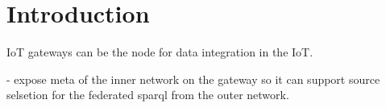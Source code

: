 \section{Introduction}

IoT gateways can be the node for data integration in the IoT.

- expose meta of the inner network on the gateway so it can support source selsetion for the federated sparql from the outer network.